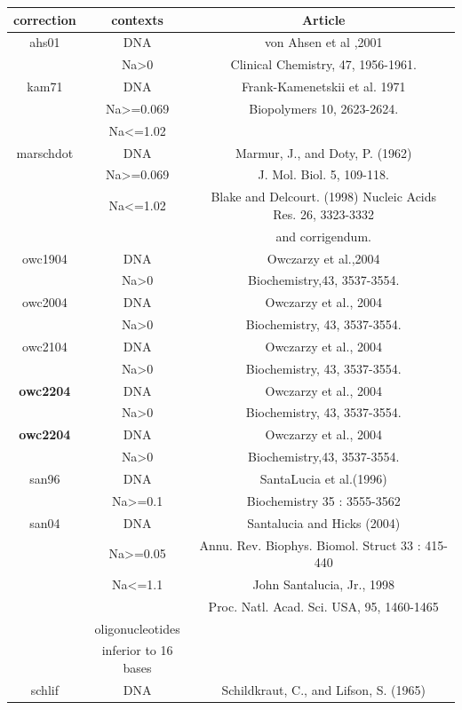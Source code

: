 \documentclass{article}
\begin{document}
\begin{table}[hc]
\begin{tabular}[h]{| c | c | c |}
\textbf{correction} & \textbf{contexts} & \textbf{Article} \\
\hline
ahs01 & DNA & von Ahsen et al ,2001 \\
 & Na>0 & Clinical Chemistry, 47, 1956-1961.\\
 \hline
kam71 & DNA & Frank-Kamenetskii et al. 1971 \\
 & Na>=0.069  & Biopolymers 10, 2623-2624.\\
 & Na<=1.02  & \\
 \hline
marschdot & DNA & Marmur, J., and Doty, P. (1962) \\
 & Na>=0.069  & J. Mol. Biol. 5, 109-118.\\
 & Na<=1.02 & Blake and Delcourt. (1998) Nucleic Acids Res. 26, 3323-3332 \\ 
 & & and corrigendum.\\
 \hline
owc1904 & DNA & Owczarzy et al.,2004  \\
 & Na>0 & Biochemistry,43, 3537-3554.\\
 \hline
owc2004 & DNA & Owczarzy et al., 2004 \\
 & Na>0 & Biochemistry, 43, 3537-3554.\\ 
 \hline
owc2104 & DNA & Owczarzy et al., 2004 \\
 & Na>0 & Biochemistry, 43, 3537-3554.\\
 \hline 
\textbf{owc2204} & DNA & Owczarzy et al., 2004 \\
 & Na>0 & Biochemistry, 43, 3537-3554.\\
 \hline
\textbf{owc2204} & DNA & Owczarzy et al., 2004 \\
 & Na>0 & Biochemistry,43, 3537-3554.\\
 \hline
san96 & DNA & SantaLucia et al.(1996) \\
 & Na>=0.1 & Biochemistry 35 : 3555-3562\\
 \hline
san04 & DNA & Santalucia and Hicks (2004) \\
 & Na>=0.05 & Annu. Rev. Biophys. Biomol. Struct 33 : 415-440\\
 & Na<=1.1 & John Santalucia, Jr., 1998 \\
 & & Proc. Natl. Acad. Sci. USA, 95, 1460-1465 \\
 & oligonucleotides & \\
 & inferior to 16 bases & \\   
 \hline 
schlif & DNA & Schildkraut, C., and Lifson, S. (1965) \\

\end{tabular}
\end{table}
\end{document}
